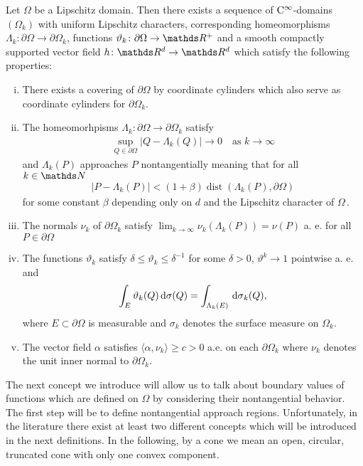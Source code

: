 \begin{thm}[Ne\v{c}as, Verchota]
  \label{thm:smoothApproximation}
  Let $\Omega$ be a Lipschitz domain.
  Then there exists a sequence of $\mathrm{C}^\infty$-domains $(\Omega_k)$ with uniform Lipschitz characters, corresponding homeomorphisms $\Lambda_k \colon \partial\Omega \to \partial\Omega_k$, functions $\vartheta_k \colon \partial\Omega \to \R^+$ and a smooth compactly supported vector field $h \colon \R^d \to \R^d$ which satisfy the following properties:
  \begin{enumerate}[i)]
    \item There exists a covering of $\partial\Omega$ by coordinate cylinders which also serve as coordinate cylinders for $\partial\Omega_k$.
    \item The homeomorhpisms $\Lambda_k \colon \partial \Omega \to \partial\Omega_k$ satisfy
      \begin{align*}
        \sup_{Q \in \partial\Omega} |Q - \Lambda_k(Q)| \to 0\quad\text{as } k \to \infty
      \end{align*}
      and $\Lambda_k(P)$ approaches $P$ nontangentially meaning that for all $k \in \N$
      \begin{align*}
        | P - \Lambda_k(P) | < (1 + \beta) \operatorname{dist}(\Lambda_k(P), \partial\Omega)
      \end{align*}
      for some constant $\beta$ depending only on $d$ and the Lipschitz character of $\Omega\,$.
    \item The normals $\nu_k$ of $\partial\Omega_k$ satisfy $\lim_{k \to \infty} \nu_k(\Lambda_k(P)) = \nu(P)$ a. e. for all $P \in \partial\Omega$
    \item The functions $\vartheta_k$ satisfy $\delta \leq \vartheta_k \leq \delta^{-1}$ for some $\delta > 0$, $\vartheta^k \to 1$ pointwise a. e. and
      \begin{align*}
        \int_E \vartheta_k(Q) \, {\operatorname{d}\!{\sigma}}(Q) = \int_{\Lambda_k(E)} \, {\operatorname{d}\!{\sigma}}_k(Q),
      \end{align*}
      where $E \subset \partial \Omega$ is measurable and $\sigma_k$ denotes the surface measure on $\Omega_k$.
    \item The vector field $\alpha$ satisfies $\langle \alpha, \nu_k \rangle \geq c > 0$ a.e. on each $\partial\Omega_k$ where $\nu_k$ denotes the unit inner normal to $\partial\Omega_k$.
  \end{enumerate}
\end{thm}

The next concept we introduce will allow us to talk about boundary values of functions which are defined on $\Omega$ by considering their nontangential behavior.
The first step will be to define nontangential approach regions.
Unfortunately, in the literature there exist at least two different concepts which will be introduced in the next definitions.
  In the following, by a cone we mean an open, circular, truncated cone with only one convex component.

